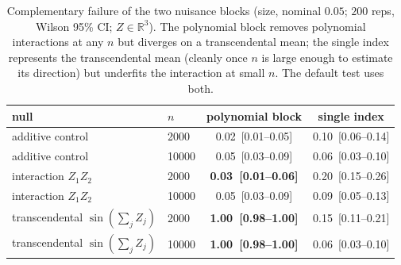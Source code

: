 \begin{table}[t]\centering\small
\begin{tabular}{llcc}
\toprule
null & $n$ & polynomial block & single index \\
\midrule
additive control & 2000 & 0.02~[0.01--0.05] & 0.10~[0.06--0.14] \\
additive control & 10000 & 0.05~[0.03--0.09] & 0.06~[0.03--0.10] \\
interaction $Z_1Z_2$ & 2000 & \textbf{0.03~[0.01--0.06]} & 0.20~[0.15--0.26] \\
interaction $Z_1Z_2$ & 10000 & 0.05~[0.03--0.09] & 0.09~[0.05--0.13] \\
transcendental $\sin(\textstyle\sum_j Z_j)$ & 2000 & \textbf{1.00~[0.98--1.00]} & 0.15~[0.11--0.21] \\
transcendental $\sin(\textstyle\sum_j Z_j)$ & 10000 & \textbf{1.00~[0.98--1.00]} & 0.06~[0.03--0.10] \\
\bottomrule
\end{tabular}
\caption{Complementary failure of the two nuisance blocks (size, nominal $0.05$; $200$ reps, Wilson 95\% CI; $Z\in\mathbb{R}^3$). The polynomial block removes polynomial interactions at any $n$ but diverges on a transcendental mean; the single index represents the transcendental mean (cleanly once $n$ is large enough to estimate its direction) but underfits the interaction at small $n$. The default test uses both.}
\label{tab:nuisance-tradeoff}
\end{table}
